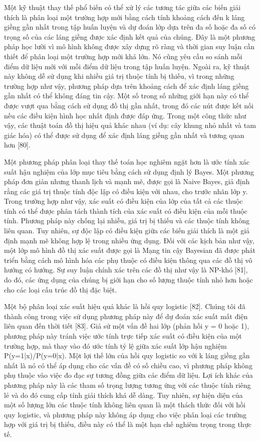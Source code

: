 \documentclass[utf8]{frontiersSCNS} %
\begin{document}
Một kỹ thuật thay thế phổ biến có thể xử lý các tương tác giữa các biến giải thích là phân loại một trường hợp mới bằng cách tính khoảng cách đến k láng giềng gần nhất trong tập huấn luyện và dự đoán lớp dựa trên đa số hoặc đa số có trọng số của các láng giềng được xác định kết quả của chúng. Đây là một phương pháp học lười vì mô hình không được xây dựng rõ ràng và thời gian suy luận cần thiết để phân loại một trường hợp mới khá lớn. Nó cũng yêu cầu so sánh mỗi điểm dữ liệu mới với mỗi điểm dữ liệu trong tập huấn luyện. Ngoài ra, kỹ thuật này không dễ sử dụng khi nhiều giá trị thuộc tính bị thiếu, vì trong những trường hợp như vậy, phương pháp dựa trên khoảng cách để xác định láng giềng gần nhất có thể không đáng tin cậy. Một số trong số những giới hạn này có thể được vượt qua bằng cách sử dụng đồ thị gần nhất, trong đó các nút được kết nối nếu các điều kiện hình học nhất định được đáp ứng. Trong một công thức như vậy, các thuật toán đồ thị hiệu quả khác nhau (ví dụ: cây khung nhỏ nhất và tam giác hóa) có thể được sử dụng để xác định láng giềng gần nhất và tương quan hơn [80].

Một phương pháp phân loại thay thế toán học nghiêm ngặt hơn là ước tính xác suất hậu nghiệm của lớp mục tiêu bằng cách sử dụng định lý Bayes. Một phương pháp đơn giản nhưng thanh lịch và mạnh mẽ, được gọi là Naive Bayes, giả định rằng các giá trị thuộc tính độc lập có điều kiện với nhau, cho trước nhãn lớp y. Trong trường hợp như vậy, xác suất có điều kiện của lớp của tất cả các thuộc tính có thể được phân tách thành tích của xác suất có điều kiện của mỗi thuộc tính. Phương pháp này chống lại nhiễu, giá trị bị thiếu và các thuộc tính không liên quan. Tuy nhiên, sự độc lập có điều kiện giữa các biến giải thích là một giả định mạnh mẽ không hợp lệ trong nhiều ứng dụng. Đối với các kịch bản như vậy, một lớp mô hình đồ thị xác suất được gọi là Mạng tin cậy Bayesian đã được phát triển bằng cách mô hình hóa các phụ thuộc có điều kiện thông qua các đồ thị vô hướng có hướng. Sự suy luận chính xác trên các đồ thị như vậy là NP-khó [81], do đó, các ứng dụng của chúng bị giới hạn cho số lượng thuộc tính nhỏ hơn hoặc cho các loại cấu trúc đồ thị đặc biệt.

Một bộ phân loại xác suất hiệu quả khác là hồi quy logistic [82]. Chúng tôi đã thành công trong việc sử dụng phương pháp này để dự đoán xác suất mất điện liên quan đến thời tiết [83]. Giả sử một vấn đề hai lớp (phản hồi y = 0 hoặc 1), phương pháp này tránh việc ước tính trực tiếp xác suất có điều kiện của một trường hợp, mà thay vào đó ước tính tỷ lệ giữa xác suất lớp hậu nghiệm P(y=1|x)/P(y=0|x). Một lợi thế lớn của hồi quy logistic so với k láng giềng gần nhất là nó có thể áp dụng cho các vấn đề có số chiều cao, vì phương pháp không phụ thuộc vào việc đo đạc sự tương đồng giữa các điểm dữ liệu. Lợi ích khác của phương pháp này là các tham số trọng lượng tương ứng với các thuộc tính riêng lẻ và do đó cung cấp tính giải thích khá dễ dàng. Tuy nhiên, sự hiện diện của một số lượng lớn các thuộc tính không liên quan là một thách thức đối với hồi quy logistic, và phương pháp này không áp dụng cho việc phân loại các trường hợp với giá trị bị thiếu, điều này có thể là một hạn chế nghiêm trọng trong thực tế.
\end{document}

